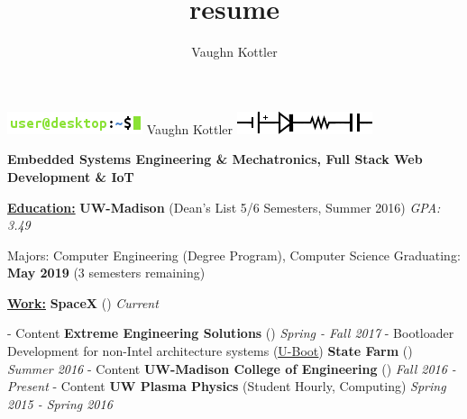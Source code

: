 \documentclass[letterpaper,10pt]{article}
\title{resume}
\author{Vaughn Kottler}
\begin{document}
\begin{center}\Huge
	\includegraphics[natwidth=150,natheight=25]{im/terminal.png}
	Vaughn Kottler
	\includegraphics[natwidth=150,natheight=25]{im/circuit.png}
\end{center}

\begin{center}\large
    \color{maroon}\textbf{
        Embedded Systems Engineering \& Mechatronics, Full Stack Web Development \& IoT
    }
\end{center}%

\noindent
\textbf{\underline{Education:}}\hspace{2.6em}%
%
\textbf{UW-Madison}
(Dean's List 5/6 Semesters, Summer 2016)
\textit{GPA: 3.49}
%
\begin{adjustwidth}{1.2in}{0in}
	Majors: Computer Engineering (Degree Program), Computer Science\break
	Graduating: \textbf{May 2019} (3 semesters remaining)\break
\end{adjustwidth}

\noindent
\textbf{\underline{Work:}}\hspace{5.6em}%
%
\textbf{SpaceX}
({\color{blue}\underline{}})
\textit{Current}
%
\begin{adjustwidth}{1.2in}{0in}
	- Content
	\break
	\textbf{Extreme Engineering Solutions}
	({\color{blue}\underline{}})
	\textit{Spring - Fall 2017}
	\break
	- Bootloader Development for non-Intel architecture systems
	({\color{blue}\underline{\href{http://www.denx.de/wiki/U-Boot}{U-Boot}}})
	\break
	\textbf{State Farm}
	({\color{blue}\underline{}})
	\textit{Summer 2016}
	\break
	- Content
	\break
	\textbf{UW-Madison College of Engineering}
	({\color{blue}\underline{}})
	\textit{Fall 2016 - Present}
	\break
	- Content
	\break
	\textbf{UW Plasma Physics}
	(Student Hourly, Computing)
	\textit{Spring 2015 - Spring 2016}
\end{adjustwidth}
\end{document}
